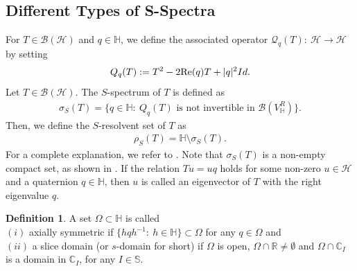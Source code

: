 \documentclass[12pt,a4paper]{article}
\theoremstyle{plain}
\theoremstyle{definition}
\newtheorem{definition}[theorem]{Definition}
\theoremstyle{remark}
\newcommand{\BB}{\mathcal B}
\newcommand{\HS}{\mathcal H}
\begin{document}
{\subsection{Different Types of S-Spectra}
For $T\in \BB(\HS)$ and $q\in\mathbb{H}$, we define the associated operator $\mathcal{Q}_q(T):\ \HS\longrightarrow \HS$ by setting
\begin{align*}Q_{q}(T):=T^2-2{\rm Re}(q)T+\vert q\vert^2Id.\end{align*}
Let $T\in \BB(\HS)$. The $S$-spectrum of $T$ is defined as
\begin{align*}\sigma_{S}(T)=\Big\{q\in\mathbb{H}:\ Q_{q}(T)\mbox{ is not invertible in } \mathcal{B}(V^{R}_{\mathbb{H}})\Big\}.\end{align*}
Then, we define the $S$-resolvent set of $T$ as
\begin{align*}\rho_{S}(T)=\mathbb{H}\setminus\sigma_{S}(T).\end{align*}
For a complete explanation, we refer to \cite{ColomboGantnerKimsey2018}. Note that $\sigma_{S}(T)$ is a non-empty compact set, as shown in \cite{FJGanter}. If the relation $Tu=uq$ holds for some non-zero $u\in \HS$ and a quaternion $q\in\mathbb{H}$, then $u$ is called an eigenvector of $T$ with the right eigenvalue $q$.
\begin{definition} \label{def:axially-symmetric}
{\rm A set $\Omega\subset\mathbb{H}$ is called\\
\noindent $(i)$ axially symmetric if $\{hqh^{-1}:\ h\in\mathbb{H}\}\subset \Omega$ for any $q\in \Omega$ and\\
\noindent $(ii)$ a slice domain (or $s$-domain for short) if $\Omega$ is open, $\Omega\cap\mathbb{R}\neq\emptyset$ and $\Omega\cap\mathbb{C}_{I}$ is a domain in $\mathbb{C}_{I}$, for any $I\in\mathbb{S}$.}
\end{definition}

}
\end{document}
